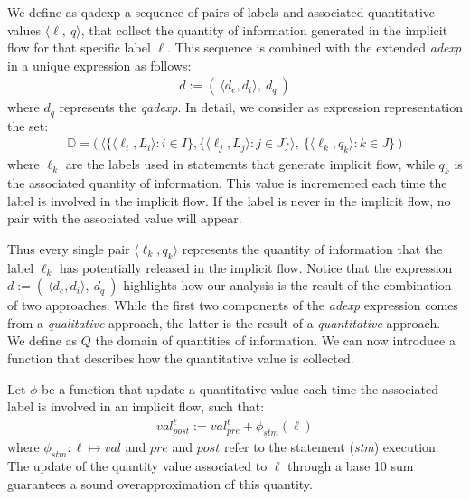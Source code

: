 \documentclass{llncs}
\newcommand{\blangle}{\big\langle}
\newcommand{\brangle}{\big\rangle}
\begin{document}
\begin{definition}\label{qadexp_def}
We define as \textnormal{qadexp} a sequence of pairs of labels and associated quantitative values $\langle\ell,\ q\rangle$, that collect the quantity of information generated in the implicit flow for that specific label $\ell$. This sequence is combined with the extended \emph{adexp} in a unique expression as follows: 
\begin{align*}
d:=(\ \langle d_e, d_i \rangle ,\ d_q\ )
\end{align*}
where $d_q$ represents the \emph{qadexp}. In detail, we consider as expression representation the set:
\begin{align*}
\mathds{D}= \big (\ \blangle\{\langle \ell_i, L_i\rangle : i \in I\}, \{\langle \ell_j, L_j\rangle : j \in J\}\brangle,\ \{\langle \ell_k, q_k \rangle:k\in J \}\ \big )
\end{align*}
where $\ell_k$ are the labels used in statements that generate implicit flow, while $q_k$ is the associated quantity of information. This value is incremented each time the label is involved in the implicit flow. If the label is never in the implicit flow, no pair with the associated value will appear. 
\end{definition}

\noindent Thus every single pair $\langle \ell_k, q_k \rangle$ represents the quantity of information that the label $\ell_k$ has potentially released in the implicit flow. Notice that the expression $d:=(\ \langle d_e, d_i \rangle ,\ d_q\ )$ highlights how our analysis is the result of the combination of two approaches. While the first two components of the \emph{adexp} expression comes from a \emph{qualitative} approach, the latter is the result of a \emph{quantitative} approach.\\

\noindent We define as $Q$ the domain of quantities of information. We can now introduce a function that describes how the quantitative value is collected.

\begin{definition}\label{quant_funct}
Let $\phi$ be a function that update a quantitative value each time the associated label is involved in an implicit flow, such that:
\begin{align*}
val_{post}^\ell := val_{pre}^\ell + \phi_{stm} (\ell)
\end{align*}
where $\phi_{stm}  : \ell \mapsto val$ and $pre$ and $post$ refer to the statement (\emph{stm}) execution. The update of the quantity value associated to $\ell$ through a base 10 sum guarantees a sound overapproximation of this quantity.
\end{definition}
\end{document}
